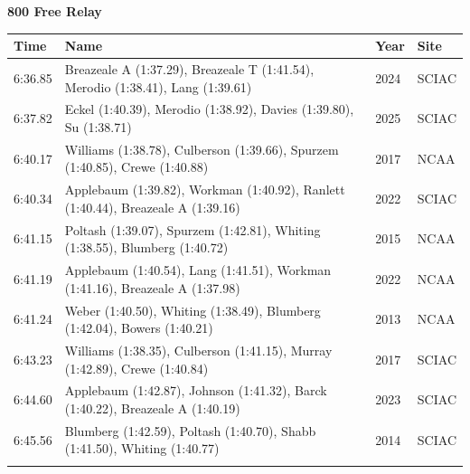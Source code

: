 \noindent\begin{minipage}[t]{0.98\textwidth}
\centering
\textbf{\textcolor{teamprimary}{800 Free Relay}}\par
\vspace{0.5em}
\centering
\small
\renewcommand{\arraystretch}{1.0}
\setlength{\tabcolsep}{4pt}
\begin{tabular}{@{}p{2.7cm}p{4.3cm}p{1.6cm}p{2.7cm}@{}}
\toprule
\textbf{Time} & \textbf{Name} & \textbf{Year} & \textbf{Site} \\
\midrule
6:36.85 & Breazeale A (1:37.29), Breazeale T (1:41.54), Merodio (1:38.41), Lang (1:39.61) & 2024 & SCIAC \\
6:37.82 & Eckel (1:40.39), Merodio (1:38.92), Davies (1:39.80), Su (1:38.71) & 2025 & SCIAC \\
6:40.17 & Williams (1:38.78), Culberson (1:39.66), Spurzem (1:40.85), Crewe (1:40.88) & 2017 & NCAA \\
6:40.34 & Applebaum (1:39.82), Workman (1:40.92), Ranlett (1:40.44), Breazeale A (1:39.16) & 2022 & SCIAC \\
6:41.15 & Poltash (1:39.07), Spurzem (1:42.81), Whiting (1:38.55), Blumberg (1:40.72) & 2015 & NCAA \\
6:41.19 & Applebaum (1:40.54), Lang (1:41.51), Workman (1:41.16), Breazeale A (1:37.98) & 2022 & NCAA \\
6:41.24 & Weber (1:40.50), Whiting (1:38.49), Blumberg (1:42.04), Bowers (1:40.21) & 2013 & NCAA \\
6:43.23 & Williams (1:38.35), Culberson (1:41.15), Murray (1:42.89), Crewe (1:40.84) & 2017 & SCIAC \\
6:44.60 & Applebaum (1:42.87), Johnson (1:41.32), Barck (1:40.22), Breazeale A (1:40.19) & 2023 & SCIAC \\
6:45.56 & Blumberg (1:42.59), Poltash (1:40.70), Shabb (1:41.50), Whiting (1:40.77) & 2014 & SCIAC \\
\bottomrule
\vspace{0.5em}
\end{tabular}
\end{minipage}
\vspace{1.2em}
